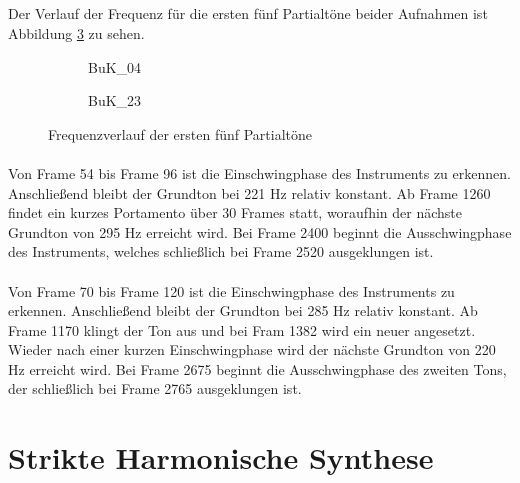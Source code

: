 \subsection{}
Der Verlauf der Frequenz für die ersten fünf Partialtöne beider Aufnahmen ist Abbildung \ref{fig:freq} zu sehen.

\begin{figure}[H]
    \centering
    \begin{subfigure}{.5\textwidth}
        \centering
        \caption{BuK\_04}
        \scalebox{0.5}{}
        \label{fig:freq04}
    \end{subfigure}%
    \begin{subfigure}{.5\textwidth}
        \centering
        \caption{BuK\_23}
        \scalebox{0.5}{}
        \label{fig:freq23}
    \end{subfigure}
    \caption{Frequenzverlauf der ersten fünf Partialtöne}
    \label{fig:freq}
\end{figure}

\paragraph{}
Von Frame 54 bis Frame 96 ist die Einschwingphase des Instruments zu erkennen.
Anschließend bleibt der Grundton bei 221 Hz relativ konstant.
Ab Frame 1260 findet ein kurzes Portamento über 30 Frames statt, woraufhin der nächste Grundton von 295 Hz erreicht wird.
Bei Frame 2400 beginnt die Ausschwingphase des Instruments, welches schließlich bei Frame 2520 ausgeklungen ist.

\paragraph{}
Von Frame 70 bis Frame 120 ist die Einschwingphase des Instruments zu erkennen.
Anschließend bleibt der Grundton bei 285 Hz relativ konstant.
Ab Frame 1170 klingt der Ton aus und bei Fram 1382 wird ein neuer angesetzt.
Wieder nach einer kurzen Einschwingphase wird der nächste Grundton von 220 Hz erreicht wird.
Bei Frame 2675 beginnt die Ausschwingphase des zweiten Tons, der schließlich bei Frame 2765 ausgeklungen ist.


\section{Strikte Harmonische Synthese}
\label{sec:2}

